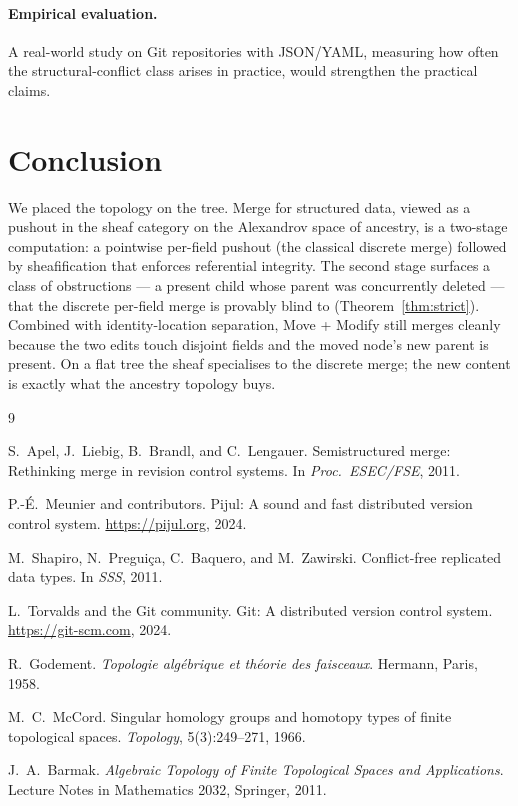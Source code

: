 \documentclass[11pt,a4paper]{article}
\begin{document}
\paragraph{Empirical evaluation.} A real-world study on Git repositories
with JSON/YAML, measuring how often the structural-conflict class arises
in practice, would strengthen the practical claims.


\section{Conclusion}

We placed the topology on the tree. Merge for structured data, viewed as
a pushout in the sheaf category on the Alexandrov space of ancestry, is
a two-stage computation: a pointwise per-field pushout (the classical
discrete merge) followed by sheafification that enforces referential
integrity. The second stage surfaces a class of obstructions --- a
present child whose parent was concurrently deleted --- that the discrete
per-field merge is provably blind to (Theorem~\ref{thm:strict}). Combined
with identity-location separation, Move + Modify still merges cleanly
because the two edits touch disjoint fields and the moved node's new
parent is present. On a flat tree the sheaf specialises to the discrete
merge; the new content is exactly what the ancestry topology buys.



\begin{thebibliography}{9}

S.~Apel, J.~Liebig, B.~Brandl, and C.~Lengauer.
\newblock Semistructured merge: Rethinking merge in revision control systems.
\newblock In \emph{Proc.\ ESEC/FSE}, 2011.

P.-{\'E}.~Meunier and contributors.
\newblock Pijul: A sound and fast distributed version control system.
\newblock \url{https://pijul.org}, 2024.

M.~Shapiro, N.~Pregui{\c{c}}a, C.~Baquero, and M.~Zawirski.
\newblock Conflict-free replicated data types.
\newblock In \emph{SSS}, 2011.

L.~Torvalds and the Git community.
\newblock Git: A distributed version control system.
\newblock \url{https://git-scm.com}, 2024.

R.~Godement.
\newblock \emph{Topologie alg\'ebrique et th\'eorie des faisceaux}.
\newblock Hermann, Paris, 1958.

M.~C.~McCord.
\newblock Singular homology groups and homotopy types of finite topological
spaces.
\newblock \emph{Topology}, 5(3):249--271, 1966.

J.~A.~Barmak.
\newblock \emph{Algebraic Topology of Finite Topological Spaces and
Applications}.
\newblock Lecture Notes in Mathematics 2032, Springer, 2011.

\end{thebibliography}
\end{document}
